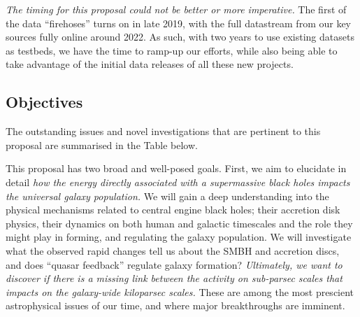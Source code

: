 \smallskip
\smallskip
\noindent
{\it The timing for this proposal could not be better or more imperative.} 
The first of the data ``firehoses'' turns on in late 2019, with
the full datastream from our key sources fully online around 2022. 
As such, with two years to use existing datasets as testbeds, we 
have the time to ramp-up our efforts, while also being able to 
take advantage of the initial data releases of all these new projects. 




\subsection{Objectives}

\smallskip
\smallskip
\noindent
The outstanding issues and novel investigations 
that are pertinent to this proposal are summarised in the Table below. 

\smallskip
\smallskip
\noindent


\iffalse
\smallskip 
\smallskip
\noindent
This proposal has two broad and well-posed goals.  
First, we aim to
elucidate in detail {\it how the energy directly associated with a
supermassive black holes impacts the universal galaxy population.}  We
will gain a deep understanding into the physical mechanisms related to
central engine black holes; their accretion disk physics, their
dynamics on both human and galactic timescales and the role they might
play in forming, and regulating the galaxy population. 
We will investigate what the observed rapid changes tell us about the SMBH and accretion discs, 
and does ``quasar feedback'' regulate galaxy formation?
{\it Ultimately, we want to discover if there is a missing link between the 
activity on sub-parsec scales that impacts on the galaxy-wide kiloparsec scales.}
These are among the most prescient astrophysical issues of our time, 
and where major breakthroughs are imminent.

